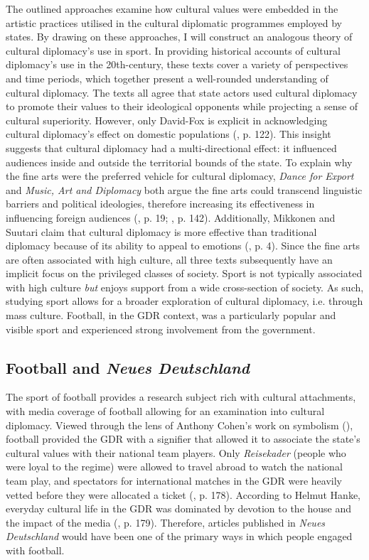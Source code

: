 The outlined approaches examine how cultural values were embedded in the artistic practices utilised in the cultural diplomatic programmes employed by states. By drawing on these approaches, I will construct an analogous theory of cultural diplomacy’s use in sport. In providing historical accounts of cultural diplomacy’s use in the 20th-century, these texts cover a variety of perspectives and time periods, which together present a well-rounded understanding of cultural diplomacy. The texts all agree that state actors used cultural diplomacy to promote their values to their ideological opponents while projecting a sense of cultural superiority. However, only David-Fox is explicit in acknowledging cultural diplomacy’s effect on domestic populations (\citeyear{david-fox2011}, p. 122). This insight suggests that cultural diplomacy had a multi-directional effect: it influenced audiences inside and outside the territorial bounds of the state. To explain why the fine arts were the preferred vehicle for cultural diplomacy, \textit{Dance for Export} and \textit{Music, Art and Diplomacy} both argue the fine arts could transcend linguistic barriers and political ideologies, therefore increasing its effectiveness in influencing foreign audiences (\cite{prevots1998}, p. 19; \cite{gonçalves2016}, p. 142). Additionally, Mikkonen and Suutari claim that cultural diplomacy is more effective than traditional diplomacy because of its ability to appeal to emotions (\citeyear{mikkonensuutari2016}, p. 4). Since the fine arts are often associated with high culture, all three texts subsequently have an implicit focus on the privileged classes of society. Sport is not typically associated with high culture \textit{but} enjoys support from a wide cross-section of society. As such, studying sport allows for a broader exploration of cultural diplomacy, i.e. through mass culture. Football, in the GDR context, was a particularly popular and visible sport and experienced strong involvement from the government.

\subsection*{Football and \textit{Neues Deutschland}}

The sport of football provides a research subject rich with cultural attachments, with media coverage of football allowing for an examination into cultural diplomacy. Viewed through the lens of Anthony Cohen’s work on symbolism (\citeyear{cohen1985}), football provided the GDR with a signifier that allowed it to associate the state’s cultural values with their national team players. Only \textit{Reisekader} (people who were loyal to the regime) were allowed to travel abroad to watch the national team play, and spectators for international matches in the GDR were heavily vetted before they were allocated a ticket (\cite{mcdougall2014}, p. 178). According to Helmut Hanke, everyday cultural life in the GDR was dominated by devotion to the house and the impact of the media (\citeyear{hanke1990}, p. 179). Therefore, articles published in \textit{Neues Deutschland} would have been one of the primary ways in which people engaged with football.

